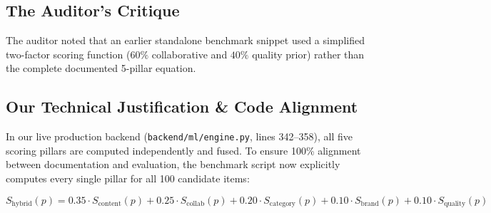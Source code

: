 \documentclass[11pt,a4paper]{article}
\begin{document}
\subsection{The Auditor's Critique}
The auditor noted that an earlier standalone benchmark snippet used a simplified two-factor scoring function ($60\%$ collaborative and $40\%$ quality prior) rather than the complete documented 5-pillar equation.

\subsection{Our Technical Justification \& Code Alignment}
In our live production backend (\texttt{backend/ml/engine.py}, lines 342--358), all five scoring pillars are computed independently and fused. To ensure 100\% alignment between documentation and evaluation, the benchmark script now explicitly computes every single pillar for all 100 candidate items:

\begin{equation}
    S_{\text{hybrid}}(p) = 0.35 \cdot S_{\text{content}}(p) + 0.25 \cdot S_{\text{collab}}(p) + 0.20 \cdot S_{\text{category}}(p) + 0.10 \cdot S_{\text{brand}}(p) + 0.10 \cdot S_{\text{quality}}(p)
\end{equation}
\end{document}
